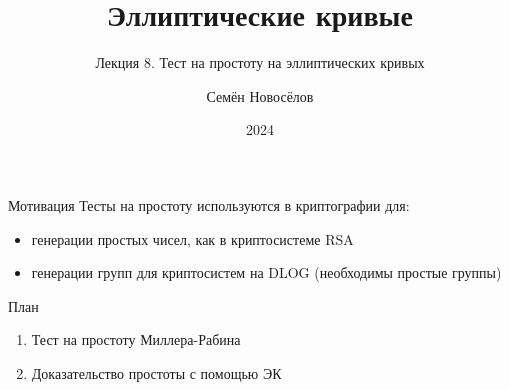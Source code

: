 \documentclass{beamer}
\title{Эллиптические кривые}
\subtitle{Лекция 8. Тест на простоту на эллиптических кривых}
\author{Семён Новосёлов}
\institute{БФУ им. И. Канта}
\date{2024}
\begin{document}
\frame{\titlepage}

\begin{frame}{Мотивация}
	Тесты на простоту используются в криптографии для:
	\vspace{0.5em}
	\begin{itemize}
	    \item генерации простых чисел, как в криптосистеме RSA
	    \item генерации групп для криптосистем на DLOG (необходимы простые группы)
	\end{itemize}
\end{frame}

\begin{frame}{План}
	\begin{enumerate}
		\item Тест на простоту Миллера-Рабина
		\item Доказательство простоты с помощью ЭК
	\end{enumerate}
\end{frame}
\end{document}
